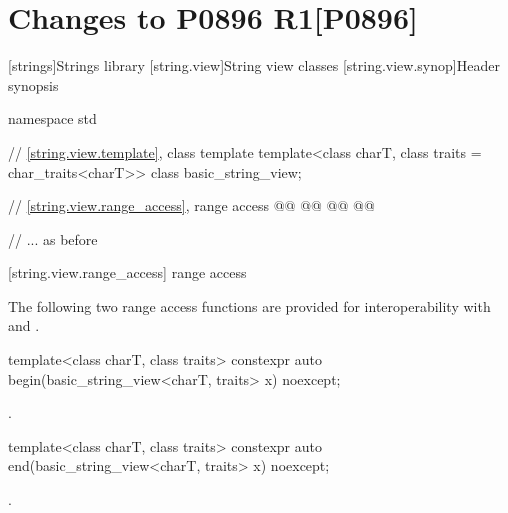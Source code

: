 
\part[Changes to P0896 R1]{Changes to P0896 R1\hfill[P0896]}\label{P0896}

\setcounter{chapter}{24}
[strings]{Strings library}
\setcounter{section}{3}
[string.view]{String view classes}
[string.view.synop]{Header  synopsis}


%
\begin{codeblock}
namespace std {
  // \ref{string.view.template}, class template 
  template<class charT, class traits = char_traits<charT>>
  class basic_string_view;

  // \ref{string.view.range_access},  range access
  @@
    @@
  @@
    @@

  // ... as before
}
\end{codeblock}


\begin{addedblock}
\setcounter{subsection}{2}
[string.view.range_access]{ range access}

\pnum
\enternote The following two range access functions are provided for interoperability with
 and .\exitnote

%
\begin{itemdecl}
template<class charT, class traits>
  constexpr auto begin(basic_string_view<charT, traits> x) noexcept;
\end{itemdecl}

\begin{itemdescr}
\pnum
\returns {}.
\end{itemdescr}

%
\begin{itemdecl}
template<class charT, class traits>
  constexpr auto end(basic_string_view<charT, traits> x) noexcept;
\end{itemdecl}

\begin{itemdescr}
\pnum
\returns {}.
\end{itemdescr}
\end{addedblock}

